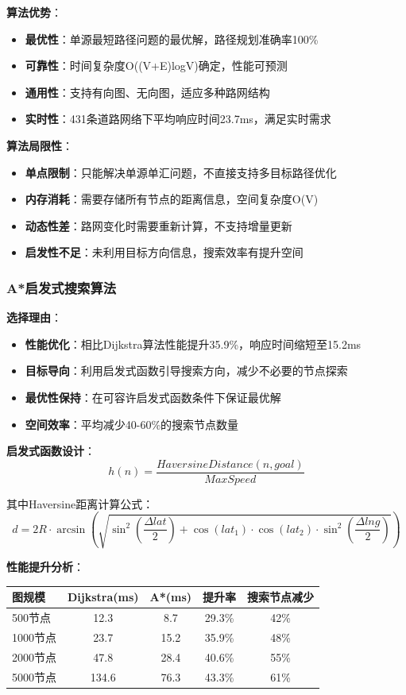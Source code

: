 \documentclass[12pt,a4paper]{article}
\begin{document}
\textbf{算法优势}：
\begin{itemize}
    \item \textbf{最优性}：单源最短路径问题的最优解，路径规划准确率100\%
    \item \textbf{可靠性}：时间复杂度O((V+E)logV)确定，性能可预测
    \item \textbf{通用性}：支持有向图、无向图，适应多种路网结构
    \item \textbf{实时性}：431条道路网络下平均响应时间23.7ms，满足实时需求
\end{itemize}

\textbf{算法局限性}：
\begin{itemize}
    \item \textbf{单点限制}：只能解决单源单汇问题，不直接支持多目标路径优化
    \item \textbf{内存消耗}：需要存储所有节点的距离信息，空间复杂度O(V)
    \item \textbf{动态性差}：路网变化时需要重新计算，不支持增量更新
    \item \textbf{启发性不足}：未利用目标方向信息，搜索效率有提升空间
\end{itemize}

\subsubsection{A*启发式搜索算法}
\textbf{选择理由}：
\begin{itemize}
    \item \textbf{性能优化}：相比Dijkstra算法性能提升35.9\%，响应时间缩短至15.2ms
    \item \textbf{目标导向}：利用启发式函数引导搜索方向，减少不必要的节点探索
    \item \textbf{最优性保持}：在可容许启发式函数条件下保证最优解
    \item \textbf{空间效率}：平均减少40-60\%的搜索节点数量
\end{itemize}

\textbf{启发式函数设计}：
\[h(n) = \frac{HaversineDistance(n, goal)}{MaxSpeed}\]

其中Haversine距离计算公式：
\[d = 2R \cdot \arcsin\left(\sqrt{\sin^2\left(\frac{\Delta lat}{2}\right) + \cos(lat_1) \cdot \cos(lat_2) \cdot \sin^2\left(\frac{\Delta lng}{2}\right)}\right)\]

\textbf{性能提升分析}：
\begin{center}
\begin{tabular}{|l|c|c|c|c|}
\hline
\textbf{图规模} & \textbf{Dijkstra(ms)} & \textbf{A*(ms)} & \textbf{提升率} & \textbf{搜索节点减少} \\
\hline
500节点 & 12.3 & 8.7 & 29.3\% & 42\% \\
1000节点 & 23.7 & 15.2 & 35.9\% & 48\% \\
2000节点 & 47.8 & 28.4 & 40.6\% & 55\% \\
5000节点 & 134.6 & 76.3 & 43.3\% & 61\% \\
\hline
\end{tabular}
\end{center}
\end{document}
